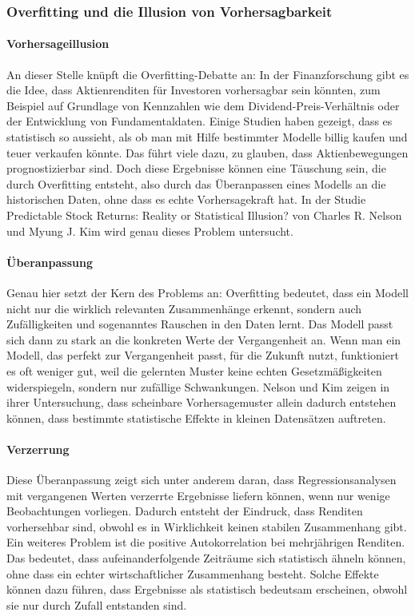\subsubsection{Overfitting und die Illusion von Vorhersagbarkeit}
\paragraph{Vorhersageillusion}
An dieser Stelle knüpft die Overfitting-Debatte an: In der Finanzforschung gibt es die Idee, dass Aktienrenditen für Investoren vorhersagbar sein könnten, zum Beispiel auf Grundlage von Kennzahlen wie dem Dividend-Preis-Verhältnis oder der Entwicklung von Fundamentaldaten. Einige Studien haben gezeigt, dass es statistisch so aussieht, als ob man mit Hilfe bestimmter Modelle billig kaufen und teuer verkaufen könnte. Das führt viele dazu, zu glauben, dass Aktienbewegungen prognostizierbar sind. Doch diese Ergebnisse können eine Täuschung sein, die durch Overfitting entsteht, also durch das Überanpassen eines Modells an die historischen Daten, ohne dass es echte Vorhersagekraft hat. In der Studie Predictable Stock Returns: Reality or Statistical Illusion? von Charles R. Nelson und Myung J. Kim wird genau dieses Problem untersucht.
\paragraph{Überanpassung}
Genau hier setzt der Kern des Problems an: Overfitting bedeutet, dass ein Modell nicht nur die wirklich relevanten Zusammenhänge erkennt, sondern auch Zufälligkeiten und sogenanntes Rauschen in den Daten lernt. Das Modell passt sich dann zu stark an die konkreten Werte der Vergangenheit an. Wenn man ein Modell, das perfekt zur Vergangenheit passt, für die Zukunft nutzt, funktioniert es oft weniger gut, weil die gelernten Muster keine echten Gesetzmäßigkeiten widerspiegeln, sondern nur zufällige Schwankungen. Nelson und Kim zeigen in ihrer Untersuchung, dass scheinbare Vorhersagemuster allein dadurch entstehen können, dass bestimmte statistische Effekte in kleinen Datensätzen auftreten.
\paragraph{Verzerrung}
Diese Überanpassung zeigt sich unter anderem daran, dass Regressionsanalysen mit vergangenen Werten verzerrte Ergebnisse liefern können, wenn nur wenige Beobachtungen vorliegen. Dadurch entsteht der Eindruck, dass Renditen vorhersehbar sind, obwohl es in Wirklichkeit keinen stabilen Zusammenhang gibt. Ein weiteres Problem ist die positive Autokorrelation bei mehrjährigen Renditen. Das bedeutet, dass aufeinanderfolgende Zeiträume sich statistisch ähneln können, ohne dass ein echter wirtschaftlicher Zusammenhang besteht. Solche Effekte können dazu führen, dass Ergebnisse als statistisch bedeutsam erscheinen, obwohl sie nur durch Zufall entstanden sind. \cite{Predictable_stock_returns}
